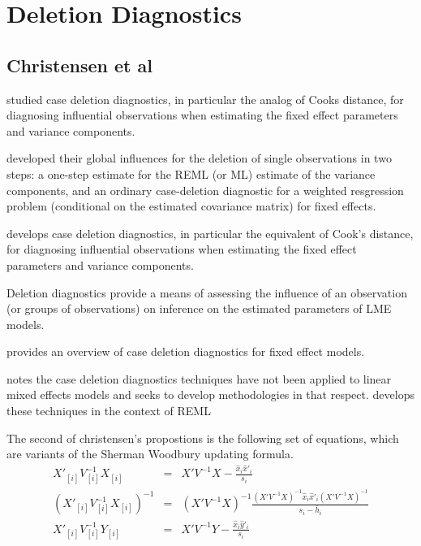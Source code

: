\documentclass[12pt, a4paper]{report}
\theoremstyle{plain}
\theoremstyle{definition}
\theoremstyle{remark}
\begin{document}
	\section{Deletion Diagnostics}
	
	\subsection{Christensen et al}         %
	\citet{Christensen} studied case deletion diagnostics, in particular the analog of Cooks
	distance, for diagnosing influential observations when estimating
	the fixed effect parameters and variance
	components.
	
	
	\citet{Christensen} developed their global influences for the deletion of single observations in two steps: a one-step estimate for the REML (or ML) estimate of the variance components, and an ordinary case-deletion diagnostic for a weighted resgression problem (conditional on the estimated covariance matrix) for fixed effects.
	
	\citet{Christensen} develops  case deletion diagnostics, in particular the equivalent of  Cook's distance, for diagnosing influential observations when estimating the fixed effect parameters and variance components.
	
	Deletion diagnostics provide a means of assessing the influence of an observation (or groups of observations) on inference on the estimated parameters of LME models. 
	
	
	
	\citet{Christensen} provides an overview of case deletion
	diagnostics for fixed effect models.
	
	
	
	
	
	\citet{Christensen} notes the case deletion diagnostics techniques have not been applied to linear mixed effects models and seeks to develop methodologies in that respect. \citet{Christensen} develops these techniques in the context of REML
	
	
	
	The second of christensen's propostions is the following set of
	equations, which are variants of the Sherman Woodbury updating
	formula.
	\begin{eqnarray}
	X'_{[i]}V_{[i]}^{-1}X_{[i]} &=& X' V^{-1}X -
	\frac{\hat{x}_{i}\hat{x}'_{i}}{s_{i}}\\
	(X'_{[i]}V_{[i]}^{-1}X_{[i]})^{-1} &=& (X' V^{-1}X)^{-1} 
	\frac{(X' V^{-1}X)^{-1}\hat{x}_{i}\hat{x}' _{i}
		(X' V^{-1}X)^{-1}}{s_{i}- \bar{h}_{i}}\\
	X'_{[i]}V_{[i]}^{-1}Y_{[i]} &=& X\prime V^{-1}Y -
	\frac{\hat{x}_{i}\hat{y}' _{i}}{s_{i}}
	\end{eqnarray}
	
\end{document}
